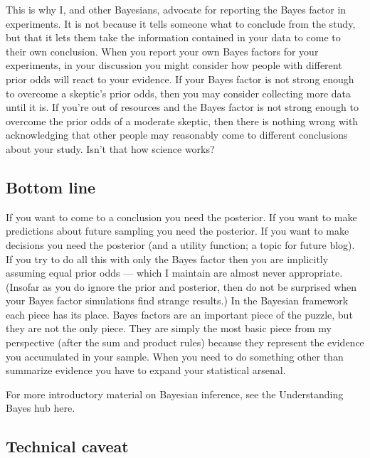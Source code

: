 This is why I, and other Bayesians, advocate for reporting the Bayes factor in experiments. It is not because it tells someone what to conclude from the study, but that it lets them take the information contained in your data to come to their own conclusion. When you report your own Bayes factors for your experiments, in your discussion you might consider how people with different prior odds will react to your evidence. If your Bayes factor is not strong enough to overcome a skeptic's prior odds, then you may consider collecting more data until it is. If you're out of resources and the Bayes factor is not strong enough to overcome the prior odds of a moderate skeptic, then there is nothing wrong with acknowledging that other people may reasonably come to different conclusions about your study. Isn't that how science works?

\subsection{Bottom line}

If you want to come to a conclusion you need the posterior. If you want to make predictions about future sampling you need the posterior. If you want to make decisions you need the posterior (and a utility function; a topic for future blog). If you try to do all this with only the Bayes factor then you are implicitly assuming equal prior odds — which I maintain are almost never appropriate. (Insofar as you do ignore the prior and posterior, then do not be surprised when your Bayes factor simulations find strange results.) In the Bayesian framework each piece has its place. Bayes factors are an important piece of the puzzle, but they are not the only piece. They are simply the most basic piece from my perspective (after the sum and product rules) because they represent the evidence you accumulated in your sample. When you need to do something other than summarize evidence you have to expand your statistical arsenal.

For more introductory material on Bayesian inference, see the Understanding Bayes hub here.

\subsection{Technical caveat}

